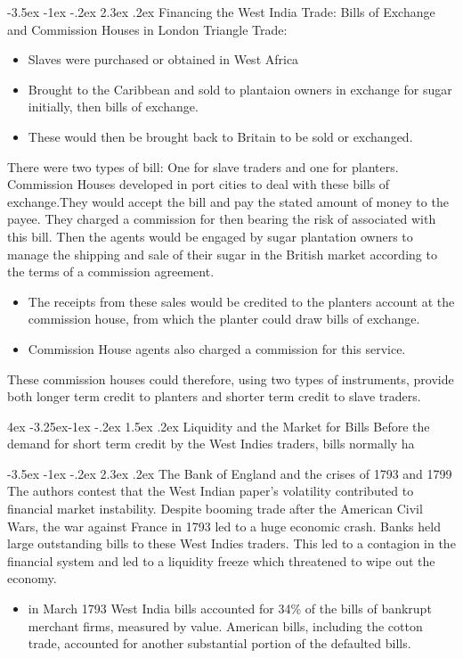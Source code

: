 \documentclass[]{article}
\makeatletter
\newcommand{\bb}{\bigbreak\noindent}
\renewcommand\section{\leftskip 0pt\@startsection {section}{1}{\z@}%
	{-3.5ex \@plus -1ex \@minus -.2ex}%
	{2.3ex \@plus.2ex}%
	{\normalfont\Large\bfseries}}
\renewcommand\subsection{\leftskip 4ex\@startsection{subsection}{2}{\z@}%
	{-3.25ex\@plus -1ex \@minus -.2ex}%
	{1.5ex \@plus .2ex}%
	{\normalfont\large\bfseries}}
\makeatother
\begin{document}
\section{Financing the West India Trade: Bills of Exchange and Commission Houses in London}
Triangle Trade:
\begin{itemize}
	\item Slaves were purchased or obtained in West Africa
	\item Brought to the Caribbean and sold to plantaion owners in exchange for sugar initially, then  bills of exchange.
	\item These would then be brought back to Britain to be sold or exchanged.
\end{itemize}
\bb
There were two types of bill: One for slave traders and one for planters.
\bb
Commission Houses developed in port cities to deal with these bills of exchange.They would accept the bill and pay the stated amount of money to the payee. They charged a commission for then bearing the risk of associated with this bill.
\bb
Then the agents would be engaged by sugar plantation owners to manage the shipping and sale of their sugar in the British market according to the terms of a commission agreement. 
\begin{itemize}[leftmargin=10ex]
	\item The receipts from these sales would be credited to the planters account at the commission house, from which the planter could draw bills of exchange. 
	\item Commission House agents also charged a commission for this service.
\end{itemize}
\bb
These commission houses could therefore, using two types of instruments, provide both longer term credit to planters and shorter term credit to slave traders.

	\subsection{Liquidity and the Market for Bills}
	Before the demand for short term credit by the West Indies traders, bills normally ha

\section{The Bank of England and the crises of 1793 and 1799}
The authors contest that the West Indian paper's volatility contributed to financial market instability. Despite booming trade after the American Civil Wars, the war against France in 1793 led to a huge economic crash. Banks held large outstanding bills to these West Indies traders. This led to a contagion in the financial system and led to a liquidity freeze which threatened to wipe out the economy. 
\begin{itemize}
	\item in March 1793 West India bills accounted for 34\% of the bills of bankrupt merchant firms, measured by value. American bills, including the cotton trade, accounted for another substantial portion of the defaulted bills.
\end{itemize}
\end{document}
